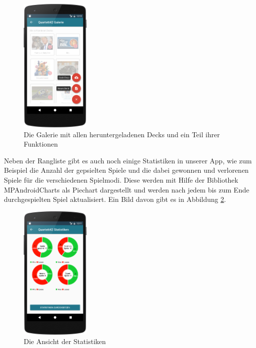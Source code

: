 \begin{figure}[htp]
	\centering
  	\includegraphics[width=0.3\textwidth]{img/screenshots/device_gallery.png}
	\caption{Die Galerie mit allen heruntergeladenen Decks und ein Teil ihrer Funktionen}
	\label{figure:implementierunggalerie}
\end{figure}

Neben der Rangliste gibt es auch noch einige Statistiken in unserer App, wie zum Beispiel die Anzahl der gepsielten Spiele und die dabei gewonnen und verlorenen Spiele für die verschiedenen Spielmodi. Diese werden mit Hilfe der Bibliothek MPAndroidCharts als Piechart dargestellt und werden nach jedem bis zum Ende durchgespielten Spiel aktualisiert. Ein Bild davon gibt es in Abbildung \ref{figure:implementierungstatistiken}.

\begin{figure}[htp]
	\centering
  	\includegraphics[width=0.3\textwidth]{img/screenshots/device_statistics.png}
	\caption{Die Ansicht der Statistiken}
	\label{figure:implementierungstatistiken}
\end{figure}

